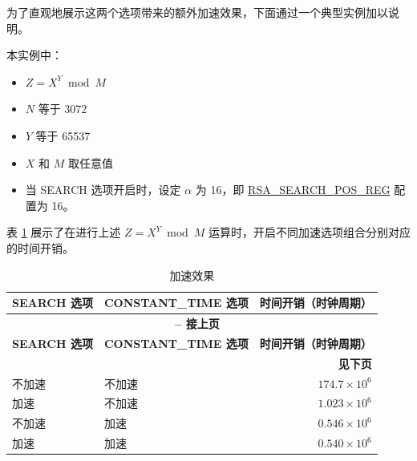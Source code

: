 \documentclass[main\_\_CN.tex]{subfiles}
\begin{document}
为了直观地展示这两个选项带来的额外加速效果，下面通过一个典型实例加以说明。

本实例中：
\begin{itemize}
    \item \begin{math}Z = X^{Y} \bmod M\end{math}
    \item \begin{math}N\end{math} 等于 3072
    \item \begin{math}Y\end{math} 等于 65537
    \item \begin{math}X\end{math} 和 \begin{math}M\end{math} 取任意值
    \item 当 SEARCH 选项开启时，设定 \begin{math} \alpha \end{math} 为 16，即 \hyperref[regdesc:RSASEARCHPOSREG]{RSA\_SEARCH\_POS\_REG} 配置为 16。
\end{itemize}

表 \ref{tab:accelerationeffect} 展示了在进行上述 \begin{math}Z = X^{Y} \bmod M\end{math} 运算时，开启不同加速选项组合分别对应的时间开销。

\begin{longtable}{ | l | l | r | }
    \caption{加速效果}\label{tab:accelerationeffect}
    \\\hline
    \rowcolor{lightgray}
    \textbf{SEARCH 选项} & \textbf{CONSTANT\_TIME 选项} & \textbf{时间开销（时钟周期）}  \\ \hline
    \endfirsthead

    \multicolumn{3}{c}{\bfseries \tablename\ \thetable{} -- 接上页}\\\hline

    \rowcolor{lightgray}
    \textbf{SEARCH 选项} & \textbf{CONSTANT\_TIME 选项} & \textbf{时间开销（时钟周期）}  \\ \hline
    \endhead

    \multicolumn{3}{r}{\textbf{见下页}} \\
    \endfoot
    \endlastfoot
    \hline

     不加速 & 不加速 & $174.7 \times 10^6$   \\ \hline
     加速   & 不加速 & $1.023 \times 10^6$   \\ \hline
     不加速 & 加速 & $0.546 \times 10^6$     \\ \hline
     加速   & 加速 & $0.540 \times 10^6$     \\ \hline
\end{longtable}
\end{document}
